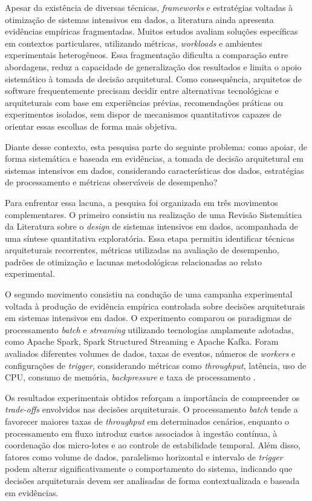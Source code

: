 Apesar da existência de diversas técnicas, \textit{frameworks} e estratégias voltadas à otimização de sistemas intensivos em dados, a literatura ainda apresenta evidências empíricas fragmentadas. Muitos estudos avaliam soluções específicas em contextos particulares, utilizando métricas, \textit{workloads} e ambientes experimentais heterogêneos. Essa fragmentação dificulta a comparação entre abordagens, reduz a capacidade de generalização dos resultados e limita o apoio sistemático à tomada de decisão arquitetural. Como consequência, arquitetos de software frequentemente precisam decidir entre alternativas tecnológicas e arquiteturais com base em experiências prévias, recomendações práticas ou experimentos isolados, sem dispor de mecanismos quantitativos capazes de orientar essas escolhas de forma mais objetiva.

Diante desse contexto, esta pesquisa parte do seguinte problema: como apoiar, de forma sistemática e baseada em evidências, a tomada de decisão arquitetural em sistemas intensivos em dados, considerando características dos dados, estratégias de processamento e métricas observáveis de desempenho?

Para enfrentar essa lacuna, a pesquisa foi organizada em três movimentos complementares. O primeiro consistiu na realização de uma Revisão Sistemática da Literatura sobre o \textit{design} de sistemas intensivos em dados, acompanhada de uma síntese quantitativa exploratória. Essa etapa permitiu identificar técnicas arquiteturais recorrentes, métricas utilizadas na avaliação de desempenho, padrões de otimização e lacunas metodológicas relacionadas ao relato experimental.

O segundo movimento consistiu na condução de uma campanha experimental voltada à produção de evidência empírica controlada sobre decisões arquiteturais em sistemas intensivos em dados. O experimento comparou os paradigmas de processamento \textit{batch} e \textit{streaming} utilizando tecnologias amplamente adotadas, como Apache Spark, Spark Structured Streaming e Apache Kafka. Foram avaliados diferentes volumes de dados, taxas de eventos, números de \textit{workers} e configurações de \textit{trigger}, considerando métricas como \textit{throughput}, latência, uso de CPU, consumo de memória, \textit{backpressure} e taxa de processamento \cite{zaharia2016apache,armbrust2018structured,kreps2011kafka,matteussi2022performance}.

Os resultados experimentais obtidos reforçam a importância de compreender os \textit{trade-offs} envolvidos nas decisões arquiteturais. O processamento \textit{batch} tende a favorecer maiores taxas de \textit{throughput} em determinados cenários, enquanto o processamento em fluxo introduz custos associados à ingestão contínua, à coordenação dos micro-lotes e ao controle de estabilidade temporal. Além disso, fatores como volume de dados, paralelismo horizontal e intervalo de \textit{trigger} podem alterar significativamente o comportamento do sistema, indicando que decisões arquiteturais devem ser analisadas de forma contextualizada e baseada em evidências.

